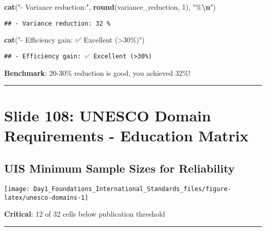 \documentclass[
]{article}
\newenvironment{Shaded}{\begin{snugshade}}{\end{snugshade}}
\newcommand{\DecValTok}[1]{\textcolor[rgb]{0.00,0.00,0.81}{#1}}
\newcommand{\FunctionTok}[1]{\textcolor[rgb]{0.13,0.29,0.53}{\textbf{#1}}}
\newcommand{\NormalTok}[1]{#1}
\newcommand{\SpecialCharTok}[1]{\textcolor[rgb]{0.81,0.36,0.00}{\textbf{#1}}}
\newcommand{\StringTok}[1]{\textcolor[rgb]{0.31,0.60,0.02}{#1}}
\begin{document}
\begin{Shaded}
\begin{Highlighting}[]
\FunctionTok{cat}\NormalTok{(}\StringTok{"{-} Variance reduction:"}\NormalTok{, }\FunctionTok{round}\NormalTok{(variance\_reduction, }\DecValTok{1}\NormalTok{), }\StringTok{"\%}\SpecialCharTok{\textbackslash{}n}\StringTok{"}\NormalTok{)}
\end{Highlighting}
\end{Shaded}

\begin{verbatim}
## - Variance reduction: 32 %
\end{verbatim}

\begin{Shaded}
\begin{Highlighting}[]
\FunctionTok{cat}\NormalTok{(}\StringTok{"{-} Efficiency gain: ✅ Excellent (\textgreater{}30\%)"}\NormalTok{)}
\end{Highlighting}
\end{Shaded}

\begin{verbatim}
## - Efficiency gain: ✅ Excellent (>30%)
\end{verbatim}

\textbf{Benchmark}: 20-30\% reduction is good, you achieved 32\%!

\begin{center}\rule{0.5\linewidth}{0.5pt}\end{center}

\section{Slide 108: UNESCO Domain Requirements - Education
Matrix}\label{slide-108-unesco-domain-requirements---education-matrix}

\subsection{UIS Minimum Sample Sizes for
Reliability}\label{uis-minimum-sample-sizes-for-reliability}

\texttt{[image: Day1\_Foundations\_International\_Standards\_files/figure-latex/unesco-domains-1]}

\textbf{Critical}: 12 of 32 cells below publication threshold

\begin{center}\rule{0.5\linewidth}{0.5pt}\end{center}
\end{document}
